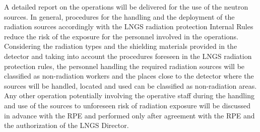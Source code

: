 A detailed report on the operations will be delivered for the use of the neutron sources. In general, procedures for the handling and the deployment of the radiation sources accordingly with the LNGS radiation protection Internal Rules reduce the risk of the exposure for the personnel involved in the operations. 
Considering the radiation types and the shielding materials provided in the detector and taking into account the procedures foreseen in the LNGS radiation protection rules, the personnel handling the required radiation sources will be classified as non-radiation workers and the places close to the detector where the sources will be handled, located and used can be classified as non-radiation areas.
Any other operation potentially involving the operative staff during the handling and use of the sources to unforeseen risk of radiation exposure will be discussed in advance with the RPE and performed only after  agreement with the RPE and the authorization of the LNGS Director.






